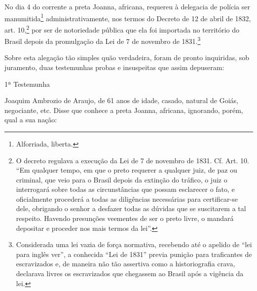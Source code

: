 {No dia 4 do corrente a preta Joanna, africana, requereu à delegacia de
polícia ser manumitida\footnote{ Alforriada, liberta.}
administrativamente, nos termos do Decreto de 12 de abril de 1832, art.
10,\footnote{ O decreto regulava a execução da Lei de 7 de novembro de
  1831. Cf. Art. 10. ``Em qualquer tempo, em que o preto requerer a
  qualquer juiz, de paz ou criminal, que veio para o Brasil depois da
  extinção do tráfico, o juiz o interrogará sobre todas as
  circunstâncias que possam esclarecer o fato, e oficialmente procederá
  a todas as diligências necessárias para certificar-se dele, obrigando
  o senhor a desfazer todas as dúvidas que se suscitarem a tal respeito.
  Havendo presunções veementes de ser o preto livre, o mandará depositar
  e proceder nos mais termos da lei''.} por ser de notoriedade pública
que ela foi importada no território do Brasil depois da promulgação da
Lei de 7 de novembro de 1831.\footnote{ Considerada uma lei vazia de
  força normativa, recebendo até o apelido de ``lei para inglês ver'', a
  conhecida ``Lei de 1831'' previa punição para traficantes de
  escravizados e, de maneira não tão assertiva como a historiografia
  crava, declarava livres os escravizados que chegassem ao Brasil após a
  vigência da lei.}

Sobre esta alegação tão simples quão verdadeira, foram de pronto
inquiridas, sob juramento, duas testemunhas probas e insuspeitas que
assim depuseram:

1ª Testemunha

Joaquim Ambrozio de Araujo, de 61 anos de idade, casado, natural de
Goiás, negociante, etc. Disse que conhece a preta Joanna, africana,
ignorando, porém, qual a sua nação:

}
